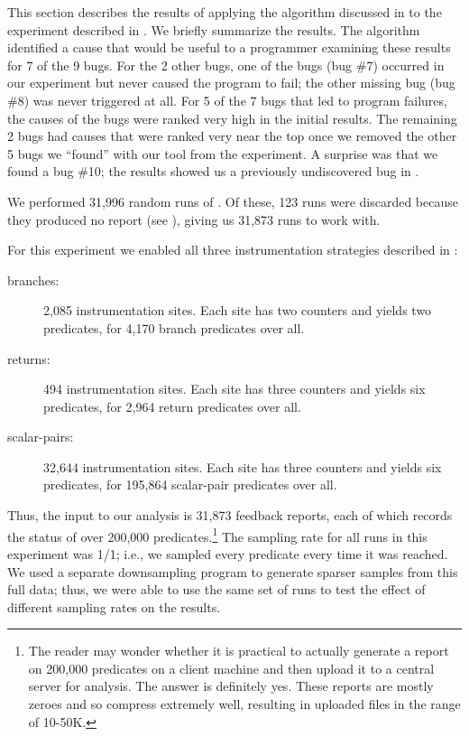 
This section describes the results of applying the algorithm discussed
in  to the experiment described in
.  We briefly summarize the results.  
The algorithm identified a cause that would be useful to a programmer
examining these results for 7 of the 9 bugs.  For the 2 other bugs,
one of the bugs (bug \#7) occurred in our experiment but never caused
the program to fail; the other missing bug (bug \#8) was never
triggered at all.  For 5 of the 7 bugs that led to program failures,
the causes of the bugs were ranked very high in the initial results.  The
remaining 2 bugs had causes that were ranked very near the top once
we removed the other 5 bugs we ``found'' with our tool from the
experiment.  A surprise was that we found a bug \#10; the results
showed us a previously undiscovered bug in \moss.

We performed 31,996 random runs of \moss.  Of these, 123 runs were
discarded because they produced no report (see
), giving us 31,873 runs to work with.

For this experiment we enabled all three instrumentation strategies
described in :

\begin{description}
\item[branches:] 2,085 instrumentation sites.  Each site has two
  counters and yields two predicates, for 4,170 branch predicates over
  all.
  
\item[returns:] 494 instrumentation sites.  Each site has three
  counters and yields six predicates, for 2,964 return predicates over
  all.
  
\item[scalar-pairs:] 32,644 instrumentation sites.  Each site has
  three counters and yields six predicates, for 195,864 scalar-pair
  predicates over all.
\end{description}

Thus, the input to our analysis is 31,873 feedback reports, each of which records the
status of over 200,000 predicates.\footnote{The reader may wonder
whether it is practical to actually generate a report on 200,000
predicates on a client machine and then upload it to a central server
for analysis.  The answer is definitely yes.  These reports are mostly
zeroes and so compress extremely well, resulting in uploaded files in
the range of 10-50K.}  The sampling rate for all runs in this
experiment was 1/1; i.e., we sampled every predicate every time it was
reached.  We used a separate downsampling program to generate sparser
samples from this full data; thus, we were able to use the same set of
runs to test the effect of different sampling rates on the results.

